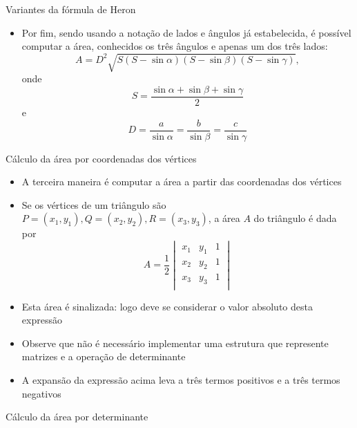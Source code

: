 \begin{frame}[fragile]{Variantes da fórmula de Heron}

    \begin{itemize}
        \item Por fim, sendo usando a notação de lados e ângulos já estabelecida, é possível computar a área, conhecidos os três ângulos e apenas um dos três lados:
        \[
            A = D^2\sqrt{S(S - \sin \alpha)(S - \sin \beta)(S - \sin \gamma)},
        \]
        onde
        \[
            S = \frac{\sin \alpha + \sin \beta + \sin \gamma}{2}
        \]
        e
        \[
            D = \frac{a}{\sin \alpha} = \frac{b}{\sin \beta} = \frac{c}{\sin \gamma}
        \]
    \end{itemize}

\end{frame}

\begin{frame}[fragile]{Cálculo da área por coordenadas dos vértices}

    \begin{itemize}
        \item A terceira maneira é computar a área a partir das coordenadas dos vértices
        \pause

        \item Se os vértices de um triângulo são $P = (x_1, y_1), Q = (x_2, y_2), R = (x_3, y_3)$, 
            a área $A$ do triângulo é dada por
        \[
            A = \frac{1}{2}\begin{vmatrix}
                x_1 & y_1 & 1 \\
                x_2 & y_2 & 1 \\
                x_3 & y_3 & 1 \\
            \end{vmatrix}
        \]
        \pause

        \item Esta área é sinalizada: logo deve se considerar o valor absoluto desta expressão
        \pause

        \item Observe que não é necessário implementar uma estrutura que represente matrizes e
            a operação de determinante
        \pause

        \item A expansão da expressão acima leva a três termos positivos e a três termos negativos
    \end{itemize}

\end{frame}

\begin{frame}[fragile]{Cálculo da área por determinante}
\end{frame}
